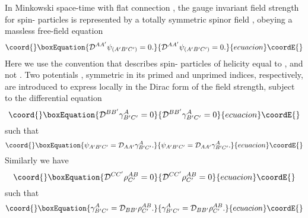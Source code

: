 \documentclass[a4paper,12pt]{article}
\begin{document}
In Minkowski space-time with flat connection \coordHE{}, the gauge invariant field strength for spin-\coordHE{} particles is represented by a totally symmetric spinor field \coordHE{}, obeying a massless free-field equation
\begin{equation}\coord{}\boxEquation{
{\cal D}^{AA'}\psi_{(A'B'C')}=0.
}{
{\cal D}^{AA'}\psi_{(A'B'C')}=0.
}{ecuacion}\coordE{}\end{equation}
Here we use the convention that \coordHE{} describes spin-\coordHE{} particles of helicity equal to \coordHE{}, and not \coordHE{}.
Two potentials \coordHE{}, symmetric in its primed and unprimed indices, respectively, are introduced to express \coordHE{} locally in the Dirac form of the field strength, subject to the differential equation\begin{equation}\coord{}\boxEquation{
{\cal D}^{BB'}\gamma^A_{B'C'}=0
}{
{\cal D}^{BB'}\gamma^A_{B'C'}=0
}{ecuacion}\coordE{}\end{equation}
such that 
\begin{equation}\coord{}\boxEquation{\psi_{A'B'C'}={\cal D}_{AA'}\gamma^A_{B'C'}.}{\psi_{A'B'C'}={\cal D}_{AA'}\gamma^A_{B'C'}.}{ecuacion}\coordE{}\end{equation}
Similarly we have
\begin{equation}\coord{}\boxEquation{{\cal D}^{CC'}\rho^{AB}_{C'}=0
}{{\cal D}^{CC'}\rho^{AB}_{C'}=0
}{ecuacion}\coordE{}\end{equation}
such that 
\begin{equation}\coord{}\boxEquation{
\gamma^A_{B'C'}={\cal D}_{BB'}\rho^{AB}_{C'}.
}{
\gamma^A_{B'C'}={\cal D}_{BB'}\rho^{AB}_{C'}.
}{ecuacion}\coordE{}\end{equation}
\end{document}
